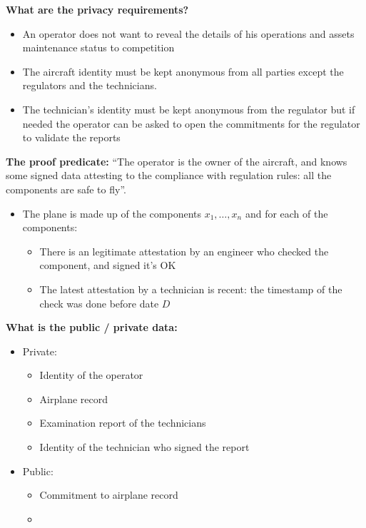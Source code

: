 \textbf{What are the privacy requirements?}
\begin{itemize}
    \item An operator does not want to reveal the details of his operations and assets maintenance status to competition
    \item The aircraft identity must be kept anonymous from all parties except the regulators and the technicians.
    \item The technician’s identity must be kept anonymous from the regulator but if needed the operator can be asked to open the commitments for the regulator to validate the reports
\end{itemize}
 
\textbf{The proof predicate:} “The operator is the owner of the aircraft, and knows some signed data attesting to the compliance with regulation rules: all the components are safe to fly”. 
	\begin{itemize}
     \item The plane is made up of the components $x_1, \ldots, x_n$ and for each of the components: 
				\begin{itemize}
            \item There is an legitimate attestation by an engineer who checked the component, and signed it's OK
            \item The latest attestation by a technician is recent: the timestamp of the check was done before date $D$
				\end{itemize}
	\end{itemize}


\textbf{What is the public / private data:}
    \begin{itemize}
		\item Private:
        \begin{itemize}
				\item Identity of the operator
        \item Airplane record
        \item Examination report of the technicians
        \item Identity of the technician who signed the report
				\end{itemize}
    \item Public:
        \begin{itemize}
				\item Commitment to airplane record
				\item 
				\end{itemize}
		\end{itemize}


